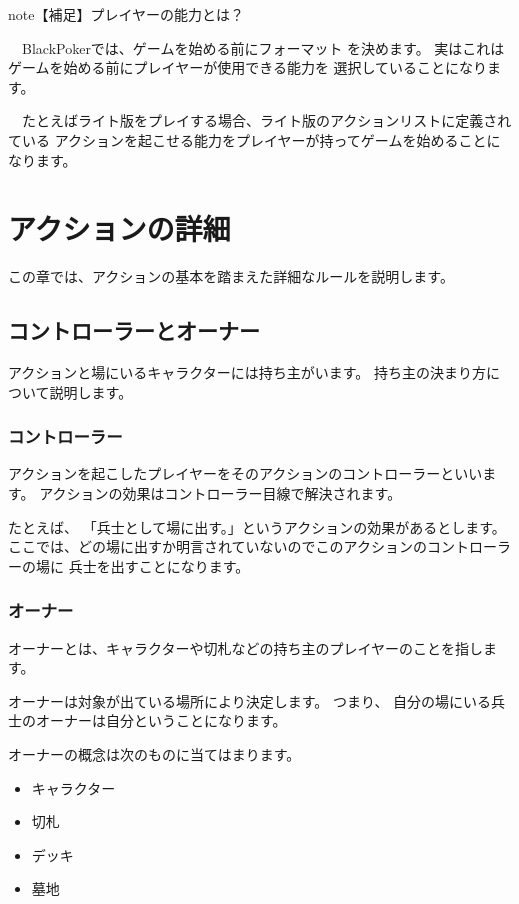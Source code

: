 \documentclass[letterpaper,10pt,dvipdfmx]{sphinxmanual}
\begin{document}
\begin{sphinxadmonition}{note}{【補足】プレイヤーの能力とは？}

　BlackPokerでは、ゲームを始める前にフォーマット
を決めます。
実はこれはゲームを始める前にプレイヤーが使用できる能力を
選択していることになります。

　たとえばライト版をプレイする場合、ライト版のアクションリストに定義されている
アクションを起こせる能力をプレイヤーが持ってゲームを始めることになります。
\end{sphinxadmonition}


\section{アクションの詳細}
\label{\detokenize{common/05-action_detail:id1}}\label{\detokenize{common/05-action_detail::doc}}
この章では、アクションの基本を踏まえた詳細なルールを説明します。


\subsection{コントローラーとオーナー}
\label{\detokenize{common/05-action_detail:id2}}
アクションと場にいるキャラクターには持ち主がいます。
持ち主の決まり方について説明します。


\subsubsection{コントローラー}
\label{\detokenize{common/05-action_detail:id3}}
アクションを起こしたプレイヤーをそのアクションのコントローラーといいます。
アクションの効果はコントローラー目線で解決されます。

たとえば、
「兵士として場に出す。」というアクションの効果があるとします。
ここでは、どの場に出すか明言されていないのでこのアクションのコントローラーの場に
兵士を出すことになります。


\subsubsection{オーナー}
\label{\detokenize{common/05-action_detail:id4}}
オーナーとは、キャラクターや切札などの持ち主のプレイヤーのことを指します。

オーナーは対象が出ている場所により決定します。
つまり、
自分の場にいる兵士のオーナーは自分ということになります。

オーナーの概念は次のものに当てはまります。
\begin{itemize}
\item {} 
キャラクター

\item {} 
切札

\item {} 
デッキ

\item {} 
墓地

\end{itemize}
\end{document}
